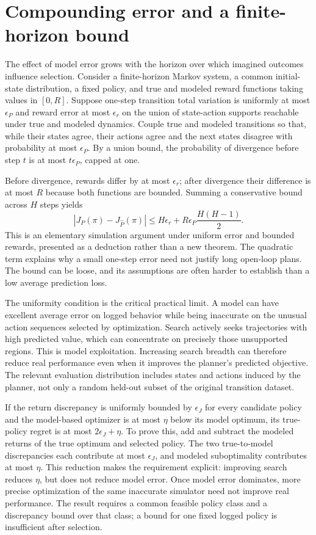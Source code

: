 \section{Compounding error and a finite-horizon bound}
\label{sec:C06:bound}
The effect of model error grows with the horizon over which imagined outcomes influence selection. Consider a finite-horizon Markov system, a common initial-state distribution, a fixed policy, and true and modeled reward functions taking values in $[0,R]$. Suppose one-step transition total variation is uniformly at most $\epsilon_P$ and reward error at most $\epsilon_r$ on the union of state-action supports reachable under true and modeled dynamics. Couple true and modeled transitions so that, while their states agree, their actions agree and the next states disagree with probability at most $\epsilon_P$. By a union bound, the probability of divergence before step $t$ is at most $t\epsilon_P$, capped at one.

Before divergence, rewards differ by at most $\epsilon_r$; after divergence their difference is at most $R$ because both functions are bounded. Summing a conservative bound across $H$ steps yields
\begin{equation}
 |J_P(\pi)-J_{\widehat P}(\pi)|
 \leq H\epsilon_r+
 R\epsilon_P\frac{H(H-1)}2.
\end{equation}
This is an elementary simulation argument under uniform error and bounded rewards, presented as a deduction rather than a new theorem. The quadratic term explains why a small one-step error need not justify long open-loop plans. The bound can be loose, and its assumptions are often harder to establish than a low average prediction loss.

The uniformity condition is the critical practical limit. A model can have excellent average error on logged behavior while being inaccurate on the unusual action sequences selected by optimization. Search actively seeks trajectories with high predicted value, which can concentrate on precisely those unsupported regions. This is model exploitation. Increasing search breadth can therefore reduce real performance even when it improves the planner's predicted objective. The relevant evaluation distribution includes states and actions induced by the planner, not only a random held-out subset of the original transition dataset.

If the return discrepancy is uniformly bounded by $\epsilon_J$ for every candidate policy and the model-based optimizer is at most $\eta$ below its model optimum, its true-policy regret is at most $2\epsilon_J+\eta$. To prove this, add and subtract the modeled returns of the true optimum and selected policy. The two true-to-model discrepancies each contribute at most $\epsilon_J$, and modeled suboptimality contributes at most $\eta$. This reduction makes the requirement explicit: improving search reduces $\eta$, but does not reduce model error. Once model error dominates, more precise optimization of the same inaccurate simulator need not improve real performance. The result requires a common feasible policy class and a discrepancy bound over that class; a bound for one fixed logged policy is insufficient after selection.

